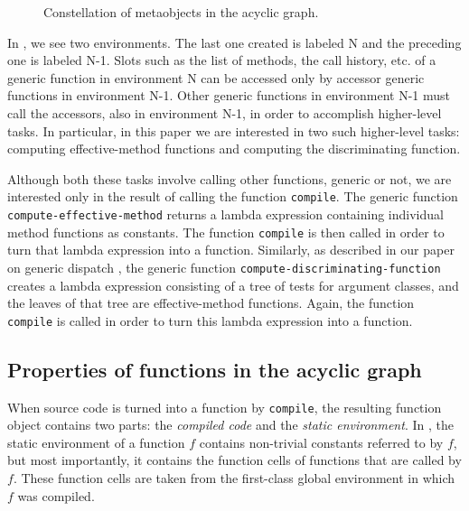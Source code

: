 \begin{figure}
\begin{center}
\end{center}
\caption{\label{fig-constellation}
Constellation of metaobjects in the acyclic graph.}
\end{figure}

In , we see two environments.  The last one
created is labeled N and the preceding one is labeled N-1.  Slots such
as the list of methods, the call history, etc. of a generic function
in environment N can be accessed only by accessor generic functions in
environment N-1.  Other generic functions in environment N-1 must call
the accessors, also in environment N-1, in order to accomplish
higher-level tasks.  In particular, in this paper we are interested in
two such higher-level tasks: computing effective-method functions and
computing the discriminating function.

Although both these tasks involve calling other functions, generic or
not, we are interested only in the result of calling the function
\texttt{compile}.  The generic function
\texttt{compute-effective-method} returns a lambda expression
containing individual method functions as constants.  The function
\texttt{compile} is then called in order to turn that lambda
expression into a function.  Similarly, as described in our paper on
generic dispatch \cite{Strandh:2014:FGD:2635648.2635654}, the generic
function \texttt{compute-discriminating-function} creates  a lambda
expression consisting of a tree of tests for argument classes, and the
leaves of that tree are effective-method functions.  Again, the
function \texttt{compile} is called in order to turn this lambda
expression into a function.

\subsection{Properties of functions in the acyclic graph}

When source code is turned into a function by \texttt{compile}, the
resulting function object contains two parts: the
\emph{compiled code} and the \emph{static environment}.  In \sicl{},
the static environment of a function $f$ contains non-trivial
constants referred to by $f$, but most importantly, it contains the
function cells of functions that are called by $f$.  These function
cells are taken from the first-class global environment in which $f$
was compiled.

